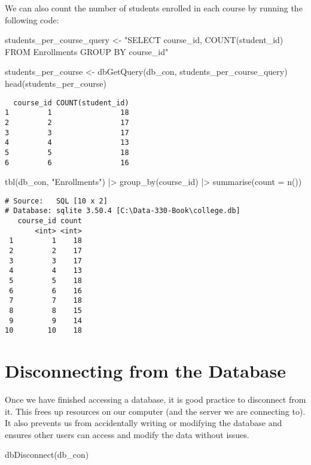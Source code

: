 \documentclass[
  letterpaper,
  DIV=11,
  numbers=noendperiod]{scrreprt}
\newenvironment{Shaded}{\begin{snugshade}}{\end{snugshade}}
\newcommand{\AttributeTok}[1]{\textcolor[rgb]{0.40,0.45,0.13}{#1}}
\newcommand{\FunctionTok}[1]{\textcolor[rgb]{0.28,0.35,0.67}{#1}}
\newcommand{\NormalTok}[1]{\textcolor[rgb]{0.00,0.23,0.31}{#1}}
\newcommand{\OtherTok}[1]{\textcolor[rgb]{0.00,0.23,0.31}{#1}}
\newcommand{\SpecialCharTok}[1]{\textcolor[rgb]{0.37,0.37,0.37}{#1}}
\newcommand{\StringTok}[1]{\textcolor[rgb]{0.13,0.47,0.30}{#1}}
\begin{document}
We can also count the number of students enrolled in each course by
running the following code:

\begin{Shaded}
\begin{Highlighting}[]
\NormalTok{students\_per\_course\_query }\OtherTok{\textless{}{-}}   \StringTok{"SELECT course\_id, COUNT(student\_id)}
\StringTok{                               FROM Enrollments}
\StringTok{                               GROUP BY course\_id"}

\NormalTok{students\_per\_course }\OtherTok{\textless{}{-}} \FunctionTok{dbGetQuery}\NormalTok{(db\_con, students\_per\_course\_query)}
\FunctionTok{head}\NormalTok{(students\_per\_course)}
\end{Highlighting}
\end{Shaded}

\begin{verbatim}
  course_id COUNT(student_id)
1         1                18
2         2                17
3         3                17
4         4                13
5         5                18
6         6                16
\end{verbatim}

\begin{Shaded}
\begin{Highlighting}[]
\FunctionTok{tbl}\NormalTok{(db\_con, }\StringTok{"Enrollments"}\NormalTok{) }\SpecialCharTok{|\textgreater{}} 
  \FunctionTok{group\_by}\NormalTok{(course\_id) }\SpecialCharTok{|\textgreater{}}
  \FunctionTok{summarise}\NormalTok{(}\AttributeTok{count =} \FunctionTok{n}\NormalTok{())}
\end{Highlighting}
\end{Shaded}

\begin{verbatim}
# Source:   SQL [10 x 2]
# Database: sqlite 3.50.4 [C:\Data-330-Book\college.db]
   course_id count
       <int> <int>
 1         1    18
 2         2    17
 3         3    17
 4         4    13
 5         5    18
 6         6    16
 7         7    18
 8         8    15
 9         9    14
10        10    18
\end{verbatim}

\section{Disconnecting from the
Database}\label{disconnecting-from-the-database}

Once we have finished accessing a database, it is good practice to
disconnect from it. This frees up resources on our computer (and the
server we are connecting to). It also prevents us from accidentally
writing or modifying the database and ensures other users can access and
modify the data without issues.

\begin{Shaded}
\begin{Highlighting}[]
\FunctionTok{dbDisconnect}\NormalTok{(db\_con)}
\end{Highlighting}
\end{Shaded}
\end{document}
